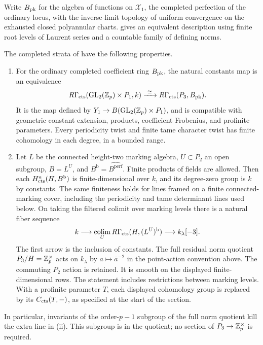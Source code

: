 Write $B_{\mathrm{pk}}$ for the algebra of functions on $\mathcal X_1$,
the completed perfection of the ordinary locus, with the inverse-limit
topology of uniform convergence on the exhausted closed polyannular
charts.   gives an equivalent description using
finite root levels of Laurent series and a countable family of defining
norms.

\begin{theorem}
\label{h3:thm:completed-cohomology}
The completed strata of 
have the following properties.
\begin{enumerate}[label=\textup{(\roman*)}]
\item For the ordinary completed coefficient ring
$B_{\mathrm{pk}}$, the natural constants map is an equivalence
\[
 R\Gamma_{\mathrm{cts}}(\operatorname{GL}_2(\mathbb Z_p)\times P_1,k)
   \xrightarrow{\ \simeq\ }
 R\Gamma_{\mathrm{cts}}(P_3,B_{\mathrm{pk}}).
\]
It is the map defined by $Y_1\to B(\operatorname{GL}_2(\mathbb Z_p)\times P_1)$,
and is compatible with geometric constant extension,
products, coefficient Frobenius, and profinite parameters.
Every periodicity twist and finite tame character twist
has finite cohomology in each degree, in a bounded range.

\item Let $L$ be the connected height-two marking algebra,
$U\subset P_2$ an open subgroup, $B=L^U$, and
$B^{\mathrm b}=\widehat{B^{\mathrm{perf}}}$.  Finite products of
fields are allowed.  Then each
$H^a_{\mathrm{cts}}(H,B^{\mathrm b})$ is finite-dimensional over $k$,
and its degree-zero group is $k$ by constants.
The same finiteness holds for lines framed on a finite
connected-marking cover, including the periodicity and
tame determinant lines used below.
On taking the filtered colimit over marking levels there
is a natural fiber sequence
\[
 k\longrightarrow
 \operatorname*{colim}_U R\Gamma_{\mathrm{cts}}(H,(L^U)^{\mathrm b})
   \longrightarrow k_{\lambda}[-3].
\]
The first arrow is the inclusion of constants.  The
full residual norm quotient $P_3/H=\mathbb Z_p^\times$ acts
on $k_\lambda$ by $a\mapsto\bar a^{-2}$ in the
point-action convention above.  The commuting $P_2$
action is retained.  It is smooth on the displayed
finite-dimensional rows.  The statement includes
restrictions between marking levels.  With a profinite
parameter $T$, each displayed cohomology group is replaced
by its $C_{\mathrm{cts}}(T,-)$, as specified at the start of the section.
\end{enumerate}
In particular, invariants of the order-$p-1$ subgroup
of the full norm quotient kill the extra line in
\textup{(ii)}.  This subgroup is in the quotient;
no section of $P_3\to\mathbb Z_p^\times$ is required.
\end{theorem}
